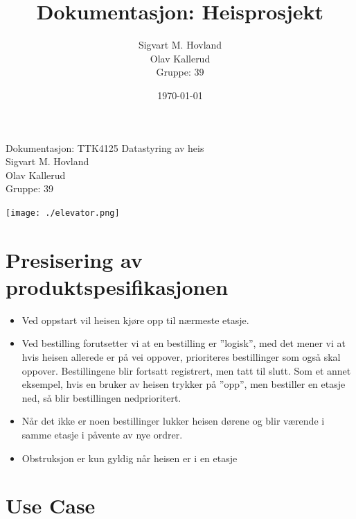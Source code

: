 \documentclass[language=norsk]{ezreport}
\title{Dokumentasjon: Heisprosjekt}
\author{Sigvart M. Hovland \\
		Olav Kallerud \\
		Gruppe: 39}
\date{\today}
\begin{document}
\begin{titlepage}
Dokumentasjon: TTK4125
Datastyring av heis \\
Sigvart M. Hovland \\
Olav Kallerud \\
Gruppe: 39

\begin{center}
\texttt{[image: ./elevator.png]}
\end{center}
\end{titlepage}

\section*{Presisering av produktspesifikasjonen}
\begin{itemize}
	\item{Ved oppstart vil heisen kjøre opp til nærmeste etasje.}
	\item{Ved bestilling forutsetter vi at en bestilling er ''logisk'', med det mener vi at hvis heisen allerede er på vei oppover, prioriteres bestillinger som også skal oppover. Bestillingene blir fortsatt registrert, men tatt til slutt. Som et annet eksempel, hvis en bruker av heisen trykker på ''opp'', men bestiller en etasje ned, så blir bestillingen nedprioritert.}
	\item{Når det ikke er noen bestillinger lukker heisen dørene og blir værende i samme etasje i påvente av nye ordrer.}
	\item{Obstruksjon er kun gyldig når heisen er i en etasje}
\end{itemize}

\section*{Use Case}
\end{document}
